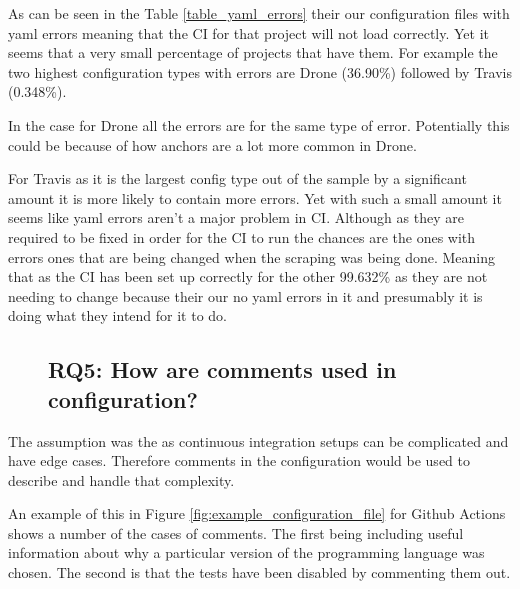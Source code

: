 \documentclass[twoside,12pt,titlepage,a4paper]{article}
\begin{document}

As can be seen in the Table \ref{table_yaml_errors} their our configuration files with yaml errors meaning that the CI for that project will not load correctly. Yet it seems that a very small percentage of projects that have them. For example the two highest configuration types with errors are Drone (36.90\%) followed by Travis (0.348\%).

In the case for Drone all the errors are for the same type of error. Potentially this could be because of how anchors are a lot more common in Drone.

For Travis as it is the largest config type out of the sample by a significant amount it is more likely to contain more errors. Yet with such a small amount it seems like yaml errors aren't a major problem in CI. Although as they are required to be fixed in order for the CI to run the chances are the ones with errors ones that are being changed when the scraping was being done. Meaning that as the CI has been set up correctly for the other 99.632\% as they are not needing to change because their our no yaml errors in it and presumably it is doing what they intend for it to do.


\pagebreak
\begin{figure}[!ht]
  \vspace*{-0.05in}
  \subsection{\textbf{RQ5}: How are comments used in configuration?}
  \label{section:RQ5}
  \vspace*{-0.05in}
\end{figure}


The assumption was the as continuous integration setups can be complicated and have edge cases. Therefore comments in the configuration would be used to describe and handle that complexity.

An example of this in Figure \ref{fig:example_configuration_file} for Github Actions shows a number of the cases of comments. The first being including useful information about why a particular version of the programming language was chosen. The second is that the tests have been disabled by commenting them out. 
\end{document}

